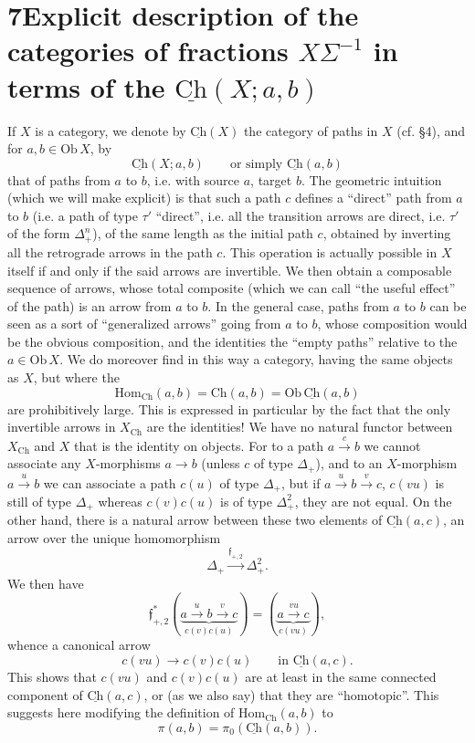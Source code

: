 \documentclass[11pt]{article}
\newcommand{\printedpage}[1]{\marginpar{\footnotesize p.~#1}}
\newcommand{\msp}[1]{\marginpar{\footnotesize [#1]}}
\newcommand{\Ch}{\underline{\mathrm{Ch}}}
\begin{document}
\printedpage{40}
\section*{7\quad Explicit description of the categories of fractions $X\Sigma^{-1}$ in terms of the $\Ch(X;a,b)$}

If $X$ is a category, we denote by $\Ch(X)$ the category of paths in $X$ (cf. §4), and for $a,b \in \mathrm{Ob}\,X$, by
\[
\Ch(X;a,b) \qquad \text{or simply } \Ch(a,b)
\]
that of paths from $a$ to $b$, i.e. with source $a$, target $b$. The geometric intuition (which we will make explicit) is that such a path $c$ defines a ``direct'' path from $a$ to $b$ (i.e. a path of type $\tau'$ ``direct'', i.e. all the transition arrows are direct, i.e. $\tau'$ of the form $\Delta_+^n$), of the same length as the initial path $c$, obtained by inverting all the retrograde arrows in the path $c$. This operation is actually possible in $X$ itself if and only if the said arrows are invertible. We then obtain a composable sequence of arrows, whose total composite (which we can call ``the useful effect'' of the path)
\msp{page 60}
is an arrow from $a$ to $b$. In the general case, paths from $a$ to $b$ can be seen as a sort of ``generalized arrows'' going from $a$ to $b$, whose composition would be the obvious composition, and the identities the ``empty paths'' relative to the $a \in \mathrm{Ob}\,X$. We do moreover find in this way a category, having the same objects as $X$, but where the
\[
\mathrm{Hom}_{\mathrm{Ch}}(a,b) = \mathrm{Ch}(a,b) = \mathrm{Ob}\,\Ch(a,b)
\]
are prohibitively large. This is expressed in particular by the fact that the only invertible arrows in $X_{\mathrm{Ch}}$ are the identities! We have no natural functor between $X_{\mathrm{Ch}}$ and $X$ that is the identity on objects. For to a path $a \xrightarrow{c} b$ we cannot associate any $X$-morphisms $a \longrightarrow b$ (unless $c$ of type $\Delta_+$), and to an $X$-morphism $a \xrightarrow{u} b$ we can associate a path $c(u)$ of type $\Delta_+$, but if $a \xrightarrow{u} b \xrightarrow{v} c$, $c(vu)$ is still of type $\Delta_+$ whereas $c(v)c(u)$ is of type $\Delta_+^2$, they are not equal. On the other hand, there is a natural arrow between these two elements of $\Ch(a,c)$, an arrow over the unique homomorphism
\[
\Delta_+ \xrightarrow{\mathfrak{f}_{+,2}} \Delta_+^2.
\]
\msp{page 61}
We then have
\[
\mathfrak{f}_{+,2}^*(\underbrace{a \xrightarrow{u} b \xrightarrow{v} c}_{c(v)c(u)}) = (\underbrace{a \xrightarrow{vu} c}_{c(vu)}),
\]
whence a canonical arrow
\[
c(vu) \longrightarrow c(v)c(u) \qquad \text{in } \Ch(a,c).
\]
This shows that $c(vu)$ and $c(v)c(u)$ are at least in the same connected component of $\Ch(a,c)$, or (as we also say) that they are ``homotopic''. This suggests here modifying the definition of $\mathrm{Hom}_{\mathrm{Ch}}(a,b)$ to
\[
\pi(a,b) = \pi_0(\Ch(a,b)).
\]
\end{document}
